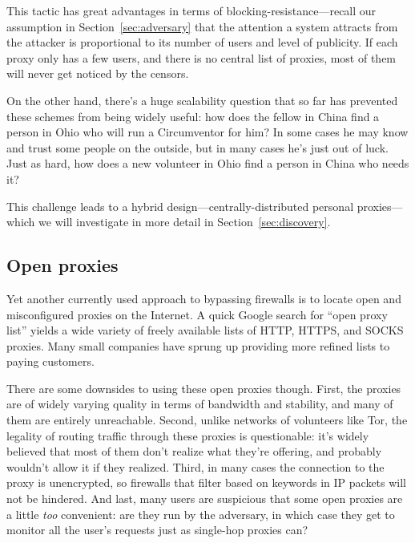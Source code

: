 \documentclass{llncs}
\begin{document}
This tactic has great advantages in terms of blocking-resistance---recall
our assumption in Section~\ref{sec:adversary} that the attention
a system attracts from the attacker is proportional to its number of
users and level of publicity. If each proxy only has a few users, and
there is no central list of proxies, most of them will never get noticed by
the censors.

On the other hand, there's a huge scalability question that so far has
prevented these schemes from being widely useful: how does the fellow
in China find a person in Ohio who will run a Circumventor for him? In
some cases he may know and trust some people on the outside, but in many
cases he's just out of luck. Just as hard, how does a new volunteer in
Ohio find a person in China who needs it?


This challenge leads to a hybrid design---centrally-distributed
personal proxies---which we will investigate in more detail in
Section~\ref{sec:discovery}.

\subsection{Open proxies}

Yet another currently used approach to bypassing firewalls is to locate
open and misconfigured proxies on the Internet. A quick Google search
for ``open proxy list'' yields a wide variety of freely available lists
of HTTP, HTTPS, and SOCKS proxies. Many small companies have sprung up
providing more refined lists to paying customers.

There are some downsides to using these open proxies though. First,
the proxies are of widely varying quality in terms of bandwidth and
stability, and many of them are entirely unreachable. Second, unlike
networks of volunteers like Tor, the legality of routing traffic through
these proxies is questionable: it's widely believed that most of them
don't realize what they're offering, and probably wouldn't allow it if
they realized. Third, in many cases the connection to the proxy is
unencrypted, so firewalls that filter based on keywords in IP packets
will not be hindered. And last, many users are suspicious that some
open proxies are a little \emph{too} convenient: are they run by the
adversary, in which case they get to monitor all the user's requests
just as single-hop proxies can?
\end{document}

